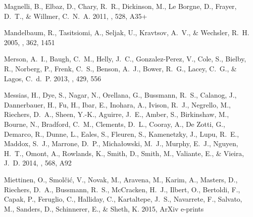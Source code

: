 \documentclass[iop]{emulateapj}
\begin{document}
\begin{thebibliography}{106}
{Magnelli}, B., {Elbaz}, D., {Chary}, R.~R., {Dickinson}, M., {Le Borgne}, D.,
  {Frayer}, D.~T., \& {Willmer}, C.~N.~A. 2011, \aap, 528, A35+

{Mandelbaum}, R., {Tasitsiomi}, A., {Seljak}, U., {Kravtsov}, A.~V., \&
  {Wechsler}, R.~H. 2005, \mnras, 362, 1451

{Merson}, A.~I., {Baugh}, C.~M., {Helly}, J.~C., {Gonzalez-Perez}, V., {Cole},
  S., {Bielby}, R., {Norberg}, P., {Frenk}, C.~S., {Benson}, A.~J., {Bower},
  R.~G., {Lacey}, C.~G., \& {Lagos}, C.~d.~P. 2013, \mnras, 429, 556

{Messias}, H., {Dye}, S., {Nagar}, N., {Orellana}, G., {Bussmann}, R.~S.,
  {Calanog}, J., {Dannerbauer}, H., {Fu}, H., {Ibar}, E., {Inohara}, A.,
  {Ivison}, R.~J., {Negrello}, M., {Riechers}, D.~A., {Sheen}, Y.-K.,
  {Aguirre}, J.~E., {Amber}, S., {Birkinshaw}, M., {Bourne}, N., {Bradford},
  C.~M., {Clements}, D.~L., {Cooray}, A., {De Zotti}, G., {Demarco}, R.,
  {Dunne}, L., {Eales}, S., {Fleuren}, S., {Kamenetzky}, J., {Lupu}, R.~E.,
  {Maddox}, S.~J., {Marrone}, D.~P., {Micha{\l}owski}, M.~J., {Murphy}, E.~J.,
  {Nguyen}, H.~T., {Omont}, A., {Rowlands}, K., {Smith}, D., {Smith}, M.,
  {Valiante}, E., \& {Vieira}, J.~D. 2014, \aap, 568, A92

{Miettinen}, O., {Smol{\v c}i{\'c}}, V., {Novak}, M., {Aravena}, M., {Karim},
  A., {Masters}, D., {Riechers}, D.~A., {Bussmann}, R.~S., {McCracken}, H.~J.,
  {Ilbert}, O., {Bertoldi}, F., {Capak}, P., {Feruglio}, C., {Halliday}, C.,
  {Kartaltepe}, J.~S., {Navarrete}, F., {Salvato}, M., {Sanders}, D.,
  {Schinnerer}, E., \& {Sheth}, K. 2015, ArXiv e-prints


\end{thebibliography}
\end{document}
